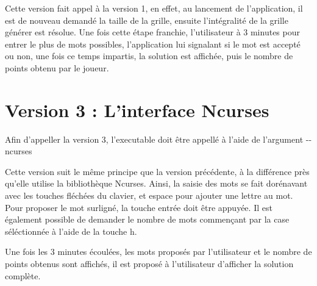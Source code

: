 Cette version fait appel à la version 1, en effet, au lancement de l'application, il est de nouveau demandé la taille de la grille, ensuite l'intégralité de la grille générer est résolue. Une fois cette étape franchie, l'utilisateur à 3 minutes pour entrer le plus de mots possibles, l'application lui signalant si le mot est accepté ou non, une fois ce temps impartis, la solution est affichée, puis le nombre de points obtenu par le joueur.\hypertarget{index_version3}{}\section{Version 3 \-: L'interface Ncurses}\label{index_version3}
Afin d'appeller la version 3, l'executable doit être appellé à l'aide de l'argument -\/-\/ncurses

Cette version suit le même principe que la version précédente, à la différence près qu'elle utilise la bibliothèque Ncurses. Ainsi, la saisie des mots se fait dorénavant avec les touches fléchées du clavier, et espace pour ajouter une lettre au mot. Pour proposer le mot surligné, la touche entrée doit être appuyée. Il est également possible de demander le nombre de mots commençant par la case séléctionnée à l'aide de la touche h.

Une fois les 3 minutes écoulées, les mots proposés par l'utilisateur et le nombre de points obtenus sont affichés, il est proposé à l'utilisateur d'afficher la solution complète. 